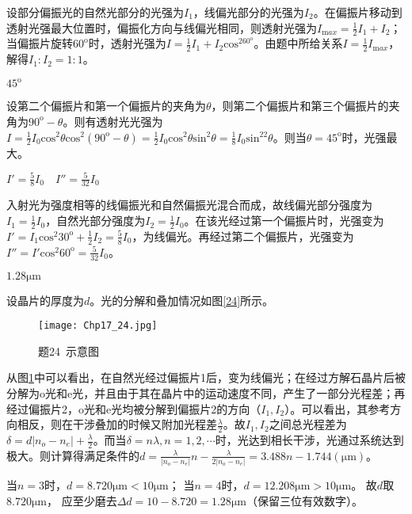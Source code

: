 \solve 设部分偏振光的自然光部分的光强为$I_1$，线偏光部分的光强为$I_2$。在偏振片移动到透射光强最大位置时，偏振化方向与线偏光相同，则透射光强为$I_{\mathrm max}=\frac{1}{2}I_1+I_2$；当偏振片旋转$60^{\mathrm{o}}$时，透射光强为$I=\frac{1}{2}I_1+I_2\mathrm{cos}^260^{\mathrm{o}}$。由题中所给关系$I=\frac{1}{2}I_{\mathrm max}$，解得$I_1:I_2=1:1$。

\exercise $45^{\mathrm{o}}$

\solve 设第二个偏振片和第一个偏振片的夹角为$\theta$，则第二个偏振片和第三个偏振片的夹角为$90^{\mathrm{o}}-\theta$。则有透射光光强为$I=\frac{1}{2}I_0\mathrm{cos}^2\theta\mathrm{cos}^2(90^{\mathrm{o}}-\theta)=\frac{1}{2}I_0\mathrm{cos}^2\theta\mathrm{sin}^2\theta=\frac{1}{8}I_0\mathrm{sin}^22\theta$。则当$\theta=45^{\mathrm{o}}$时，光强最大。

\exercise $I'=\frac{5}{8}I_0$$\quad$$I''=\frac{5}{32}I_0$

\solve 入射光为强度相等的线偏振光和自然偏振光混合而成，故线偏光部分强度为$I_1=\frac{1}{2}I_0$，自然光部分强度为$I_2=\frac{1}{2}I_0$。在该光经过第一个偏振片时，光强变为$I'=I_1\mathrm{cos}^2 30^{\mathrm{o}}+\frac{1}{2}I_2=\frac{5}{8}I_0$，为线偏光。再经过第二个偏振片，光强变为$I''=I'\mathrm{cos}^2 60^{\mathrm{o}}=\frac{5}{32}I_0$。

\exercise $1.28\mathrm{\mu m}$

\solve 设晶片的厚度为$d$。光的分解和叠加情况如图\ref{24}所示。

\begin{figure}[htbp]
	\centering
	\texttt{[image: Chp17\_24.jpg]}
	\caption{题24\ 示意图}
	\label{fig:17_24}
\end{figure}

从图\ref{fig:17_24}中可以看出，在自然光经过偏振片1后，变为线偏光；在经过方解石晶片后被分解为o光和e光，并且由于其在晶片中的运动速度不同，产生了一部分光程差；再经过偏振片2，o光和e光均被分解到偏振片2的方向（$I_1,I_2$）。可以看出，其参考方向相反，则在干涉叠加的时候又附加光程差$\frac{\lambda}{2}$。故$I_1,I_2$之间总光程差为$\delta=d|n_o-n_e|+\frac{\lambda}{2}$。而当$\delta=n\lambda,n=1,2,\cdots$时，光达到相长干涉，光通过系统达到极大。则计算得满足条件的$d=\frac{\lambda}{|n_o-n_e|}n-\frac{\lambda}{2|n_o-n_e|}=3.488n-1.744(\mathrm{\mu m})$。

当$n=3$时，$d=8.720 \mathrm{\mu m}<10 \mathrm{\mu m}$；
当$n=4$时，$d=12.208 \mathrm{\mu m}>10 \mathrm{\mu m}$。
故$d$取$8.720 \mathrm{\mu m}$，
应至少磨去$\Delta d=10-8.720=1.28 \mathrm{\mu m}$（保留三位有效数字）。
